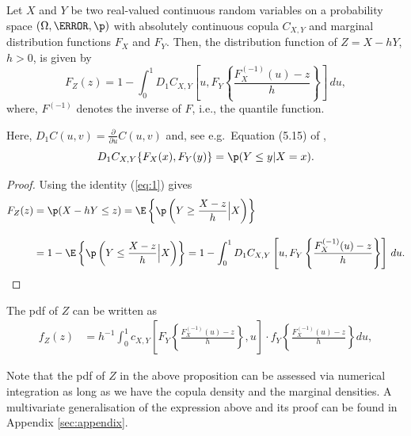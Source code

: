 \documentclass[11pt,a4paper,english]{article}
\begin{document}
\begin{proposition}
  \label{prop:dfrh}
  Let $X$ and $Y$ be two real-valued continuous random
  variables on a
  probability space $(\Omega, \F, \p)$ with
  absolutely continuous copula $C_{X, Y}$ and marginal distribution functions $F_{X}$
  and $F_{Y}$. Then, the distribution function of $Z=X-hY$, $h >0$,  is given by
  \begin{equation}
    \label{eq:3}
    F_{Z}(z) = 1- \int^1_0 D_1 C_{X, Y}
    \left[ u, F_{Y} \left\{ \frac{F^{(-1)}_{X}(u)-z}{h} \right\}
    \right]\, d u,   
  \end{equation}
  where, $F^{(-1)}$ denotes the inverse of $F$, i.e., the quantile
function.
\end{proposition}
Here, $D_1 C(u,v)=\displaystyle \frac{\partial}{\partial u}
C(u,v)$ and, see e.g.\ Equation (5.15) of \citet{McNeil2005},
\begin{equation}
  \label{eq:1}
  D_1 C_{X,Y}\{F_X(x), F_Y(y)\} = \p(Y\leq y|X=x).
\end{equation}
\begin{proof}
  Using the identity (\ref{eq:1}) gives
  \begin{align*}
    F_{Z}(z) &= \p(X - h Y\leq z) %
                 = \E\left\{\p\left(Y\geq \frac{X-z}{h}\Big|
                 X\right)\right\}\\[10pt]
               &= 1-\E\left\{\p\left(Y\leq \frac{X-z}{h}\Big|
                 X\right)\right\}%
               = 1- \int_0^1 D_1 C_{X, Y}\left[u,
                 F_{Y}\left\{\frac{F^{(-1)}_{X}(u) -
                 z}{h}\right\}\right]\, d u.
  \end{align*}
  \end{proof}

\begin{corollary} The pdf of $Z$ can be written as
  \begin{align}
  f_{Z}(z) &= h^{-1}\int_0^1 c_{X, Y} \left[
  F_{Y}\left\{\frac{F^{(-1)}_{X}(u)-z}{h}\right\}, u
  \right]
   \cdot
  f_{Y}
  \left\{\frac{F^{(-1)}_{X}(u)-z}{h}\right\} du, \label{eq:density1}
  \end{align}
  \end{corollary}
Note that the pdf of $Z$ in the above proposition can be assessed via numerical integration
as long as we have the copula density and the marginal
densities.
A multivariate generalisation of the expression above and its proof can be found in Appendix \ref{sec:appendix}.
\end{document}
